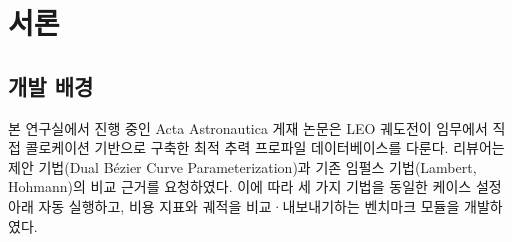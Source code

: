 \documentclass[11pt]{article}
\begin{document}
\drawborder
\thispagestyle{firstpage}


\def\lighterdate{March 12, 2026}


\begin{abstract}
본 보고서는 LEO(Low Earth Orbit) 궤도전이 임무에서 호만(Hohmann) 전이, 람버트(Lambert) 문제, 직접 콜로케이션(Direct Collocation) 세 가지 기법을 통합적으로 비교·분석하는 Python 모듈의 개발 내용을 기술한다.
본 모듈은 Acta Astronautica 투고 논문 ``Classification of Optimal Continuous Thrust Profiles for LEO Transfer Missions''의 리뷰어 대응을 위해 개발되었으며, 제안 기법인 Dual B\'{e}zier Curve Parameterization과의 비교에 사용할 기준선(baseline) 결과를 정량화하고 시각화하는 파이프라인을 제공한다.
\textbf{본 보고서의 범위는 비교 대상 기법(Hohmann, Lambert, Collocation)의 구현 및 결과에 한정되며, 제안 기법 자체는 포함하지 않는다.}
제안 기법은 MATLAB 기반으로 별도 구현되어 있으며, 본 모듈이 산출하는 CSV 및 그림 파일을 활용하여 추후 직접 비교가 이루어질 예정이다.
시간 제약 시뮬레이션 결과, $T_{max}/T_0 < 0.5$인 조건에서는 임펄스 기법이 불가능한 반면 연속 추력 기법은 전이를 성공적으로 수행하였으며, 이는 제안 기법의 비교 우위를 드러낼 핵심 시나리오로 활용될 것이다.
\end{abstract}


\section{서론}

\subsection{개발 배경}

본 연구실에서 진행 중인 Acta Astronautica 게재 논문은 LEO 궤도전이 임무에서 직접 콜로케이션 기반으로 구축한 최적 추력 프로파일 데이터베이스를 다룬다.
리뷰어는 제안 기법(Dual B\'{e}zier Curve Parameterization)과 기존 임펄스 기법(Lambert, Hohmann)의 비교 근거를 요청하였다.
이에 따라 세 가지 기법을 동일한 케이스 설정 아래 자동 실행하고, 비용 지표와 궤적을 비교·내보내기하는 벤치마크 모듈을 개발하였다.
\end{document}

